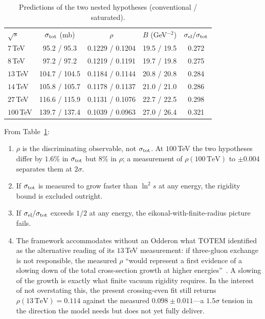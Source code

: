 \documentclass[aps,prd,preprint,nofootinbib,longbibliography]{revtex4-2}
\begin{document}
\begin{table}[t]
\caption{Predictions of the two nested hypotheses (conventional / saturated).}
\label{tab:predictions}
\begin{ruledtabular}
\begin{tabular}{lcccc}
$\sqrt{s}$ & $\sigma_{\rm tot}$ (mb) & $\rho$ & $B$ (GeV$^{-2}$) & $\sigma_{\rm el}/\sigma_{\rm tot}$ \\
\colrule
$7\,$TeV   & 95.2 / 95.3   & 0.1229 / 0.1204 & 19.5 / 19.5 & 0.272 \\
$8\,$TeV   & 97.2 / 97.2   & 0.1219 / 0.1191 & 19.7 / 19.8 & 0.275 \\
$13\,$TeV  & 104.7 / 104.5 & 0.1184 / 0.1144 & 20.8 / 20.8 & 0.284 \\
$14\,$TeV  & 105.8 / 105.7 & 0.1178 / 0.1137 & 21.0 / 21.0 & 0.286 \\
$27\,$TeV  & 116.6 / 115.9 & 0.1131 / 0.1076 & 22.7 / 22.5 & 0.298 \\
$100\,$TeV & 139.7 / 137.4 & 0.1039 / 0.0963 & 27.0 / 26.4 & 0.321 \\
\end{tabular}
\end{ruledtabular}
\end{table}

From Table~\ref{tab:predictions}:

\begin{enumerate}
\item $\rho$ is the discriminating observable, not $\sigma_{\rm tot}$. At
$100\,$TeV the two hypotheses differ by $1.6\%$ in $\sigma_{\rm tot}$ but $8\%$
in $\rho$; a measurement of $\rho(100\,\mathrm{TeV})$ to $\pm0.004$ separates
them at $2\sigma$.
\item If $\sigma_{\rm tot}$ is measured to grow faster than $\ln^2 s$ at any
energy, the rigidity bound is excluded outright.
\item If $\sigma_{\rm el}/\sigma_{\rm tot}$ exceeds $1/2$ at any energy, the
eikonal-with-finite-radius picture fails.
\item The framework accommodates without an Odderon what TOTEM identified as the
alternative reading of its $13\,$TeV measurement: if three-gluon exchange is not
responsible, the measured $\rho$ ``would represent a first evidence of a slowing
down of the total cross-section growth at higher
energies''~\cite{totem2019rho}. A slowing of the growth is exactly what finite
vacuum rigidity requires. In the interest of not overstating this, the present
crossing-even fit still returns $\rho(13\,\mathrm{TeV})=0.114$ against the
measured $0.098\pm0.011$---a $1.5\sigma$ tension in the direction the model needs
but does not yet fully deliver.
\end{enumerate}
\end{document}
